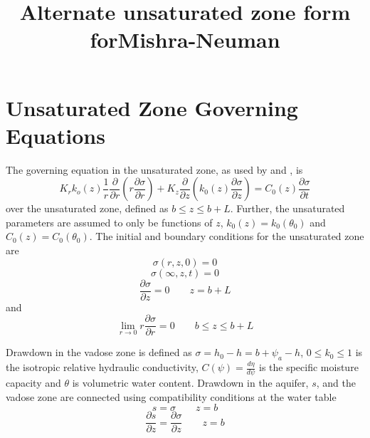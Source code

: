 \documentclass[12pt,letterpaper]{article}
\title{Alternate unsaturated zone form forMishra-Neuman}
\begin{document}
\maketitle
\linenumbers
\section{Unsaturated Zone Governing Equations}
The governing equation in the unsaturated zone, as used by \cite{mishra10} and \cite{tartakovsky07}, is
\begin{equation}
  \label{eq:unsatDim}
  K_r k_o(z) \frac{1}{r} \frac{\partial}{\partial r} \left( r\frac{\partial \sigma}{\partial r} \right) + K_z \frac{\partial}{\partial z} \left( k_0(z) \frac{\partial \sigma}{\partial z}\right) = C_0(z) \frac{\partial \sigma}{\partial t}
\end{equation}
over the unsaturated zone, defined as $b \le z \le b+L$.  Further, the unsaturated parameters are assumed to only be functions of $z$, $k_0(z)=k_0(\theta_0)$ and $C_0(z)=C_0(\theta_0)$.  The initial and boundary conditions for the unsaturated zone are  
\begin{equation}\nonumber
\sigma(r,z,0) = 0
\end{equation}
\begin{equation}\nonumber
\sigma(\infty,z,t)=0
\end{equation}
\begin{equation}\nonumber
\frac{\partial \sigma}{\partial z}=0 \qquad z=b+L
\end{equation} and 
\begin{equation}\nonumber
\lim_{r \rightarrow 0} r \frac{\partial \sigma}{\partial r} = 0 \qquad b\le z \le b+L
\end{equation}

Drawdown in the vadose zone is defined as $\sigma = h_0 - h=b+\psi_a - h$, $0 \le k_0 \le 1$ is the isotropic relative hydraulic conductivity, $C(\psi)=\frac{d\eta}{d \psi}$ is the specific moisture capacity and $\theta$ is volumetric water content.  Drawdown in the aquifer, $s$, and the vadose zone are connected using compatibility conditions at the water table
\begin{equation}\nonumber
s=\sigma \qquad z=b
\end{equation}
\begin{equation}\nonumber
\frac{\partial s}{\partial z}=\frac{\partial \sigma}{\partial z} \qquad z=b
\end{equation} 
\end{document}
